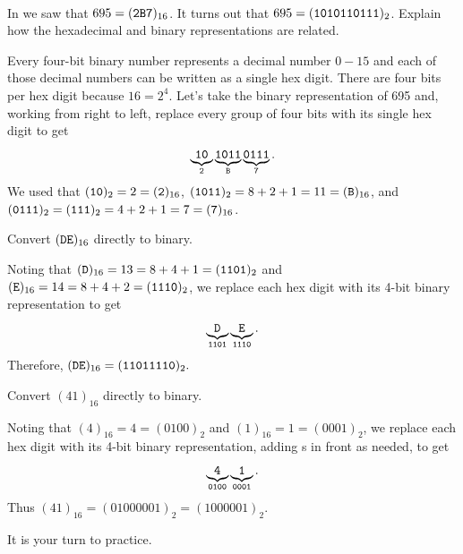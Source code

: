 \begin{exam}
\label{exam_hex_binary_conv}
~
    \begin{apart}
        \item In  we saw that $695 = (\texttt{2B7})_{16}$. It turns out that $695 = (\texttt{1010110111})_2$. Explain how the hexadecimal and binary representations are related.
            \begin{soln}
                Every four-bit binary number represents a decimal number $0-15$ and each of those decimal numbers can be written as a single hex digit. There are four bits per hex digit because $16=2^4$. Let's take the binary representation of 695 and, working from right to left, replace every group of four bits with its single hex digit to get
                    $$\underbrace{\texttt{10}}_{\texttt{2}} \underbrace{\texttt{1011}}_{\texttt{B}} \underbrace{\texttt{0111}}_{\texttt{7}}.$$
                We used that 
                $(\texttt{10})_2= 2 =(\texttt{2})_{16}$, 
                $(\texttt{1011})_2 = 8+2+1=11=(\texttt{B})_{16}$, and 
                $(\texttt{0111})_2 = (\texttt{111})_2 = 4+2+1 = 7 = (\texttt{7})_{16}$.
            \end{soln}
        \item Convert $(\texttt{DE})_{16}$ directly to binary.
            \begin{soln}
                Noting that $(\texttt{D})_{16}=13 = 8 + 4 + 1 = (\texttt{1101})_2$ and $(\texttt{E})_{16}=14 = 8 + 4 + 2 = (\texttt{1110})_2$, we replace each hex digit with its 4-bit binary representation to get 
                $$\underbrace{\texttt{D}}_{\texttt{1101}} \underbrace{\texttt{E}}_{\texttt{1110}}.$$
                Therefore, $(\texttt{DE})_{16}=(\texttt{11011110})_2.$
            \end{soln}
        \item Convert $(41)_{16}$ directly to binary.
            \begin{soln}
                Noting that $(4)_{16}= 4 = (0100)_2$ and $(1)_{16} = 1 = (0001)_2$, we replace each hex digit with its 4-bit binary representation, adding s in front as needed, to get
                $$\underbrace{\texttt{4}}_{\texttt{0100}} \underbrace{\texttt{1}}_{\texttt{0001}}.$$
                Thus $(41)_{16}=(01000001)_2=(1000001)_2$.
            \end{soln}
    \end{apart}
\end{exam}

It is your turn to practice.

